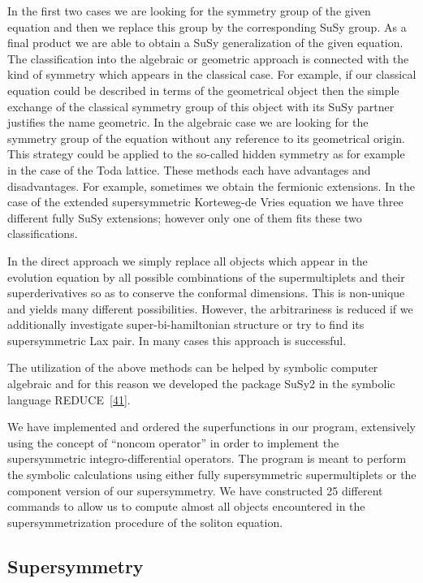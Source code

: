 {In the first two cases we are looking for the symmetry group of the
given equation and then we replace this group by the corresponding
SuSy group.  As a final product we are able to obtain a SuSy
generalization of the given equation.  The classification into the
algebraic or geometric approach is connected with the kind of symmetry
which appears in the classical case.  For example, if our classical
equation could be described in terms of the geometrical object then
the simple exchange of the classical symmetry group of this object
with its SuSy partner justifies the name geometric.  In the algebraic
case we are looking for the symmetry group of the equation without any
reference to its geometrical origin.  This strategy could be applied
to the so-called hidden symmetry as for example in the case of the
Toda lattice.  These methods each have advantages and disadvantages.
For example, sometimes we obtain the fermionic extensions.  In the
case of the extended supersymmetric Korteweg-de Vries equation we have
three different fully SuSy extensions; however only one of them fits
these two classifications.

In the direct approach we simply replace all objects which appear in
the evolution equation by all possible combinations of the
supermultiplets and their superderivatives so as to conserve the
conformal dimensions.  This is non-unique and yields many different
possibilities.  However, the arbitrariness is reduced if we
additionally investigate super-bi-hamiltonian structure or try to find
its supersymmetric Lax pair.  In many cases this approach is
successful.

The utilization of the above methods can be helped by symbolic
computer algebraic and for this reason we developed the package SuSy2
in the symbolic language REDUCE~\hyperlink{susy2-bib}{[41]}.

We have implemented and ordered the superfunctions in our program,
extensively using the concept of ``noncom operator'' in order to
implement the supersymmetric integro-differential operators.  The
program is meant to perform the symbolic calculations using either
fully supersymmetric supermultiplets or the component version of our
supersymmetry.  We have constructed 25 different commands to allow us
to compute almost all objects encountered in the supersymmetrization
procedure of the soliton equation.

\subsection{Supersymmetry}

}

